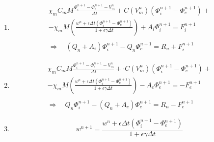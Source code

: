 \documentclass[a4paper]{article}
\begin{document}
\vspace{5mm}
\begin{enumerate}
	\item 
	\begin{equation}
	\begin{gathered}
	\chi_m C_m M \frac{	\Phi_i^{n+1}-\Phi_e^{n+1}-V_m^{n}}{\Delta t} +  C(V_m^n) (\Phi_i^{n+1}-\Phi_e^{n+1}) + \\ - \chi_m M \left(\frac{w^n + \epsilon \Delta t (\Phi_i^{n+1}-\Phi_e^{n+1})}{1+\epsilon \gamma \Delta t}   \right) + A_i \Phi_i ^{n+1} = F_i^{n+1} \\ \\
     \Rightarrow \quad (Q_n + A_i) \Phi_i^{n+1} - Q_n \Phi_e^{n+1} =R_n +  F_i^{n+1}
	\end{gathered}
	\end{equation}
	
    \item 
	\begin{equation}
	\begin{gathered}
	\chi_m C_m M \frac{	\Phi_i^{n+1}-\Phi_e^{n+1}-V_m^{n}}{\Delta t} + \cdot C(V_m^n) (\Phi_i^{n+1}-\Phi_e^{n+1}) + \\ -  \chi_m M \left(\frac{w^n + \epsilon \Delta t (\Phi_i^{n+1}-\Phi_e^{n+1})}{1+\epsilon \gamma \Delta t}   \right) - A_e \Phi_e ^{n+1} = -F_e^{n+1} \\ \\
	\Rightarrow \quad Q_n \Phi_i^{n+1} - (Q_n+A_e) \Phi_e^{n+1} =R_n - F_e^{n+1}
	\end{gathered}
	\end{equation}
	\vspace{3mm}
	\item 
	\begin{equation}
	w^{n+1} = \frac{w^n + \epsilon \Delta t (\Phi_i^{n+1}-\Phi_e^{n+1})}{1+\epsilon \gamma \Delta t}
	\end{equation}
\end{enumerate}
\end{document}
